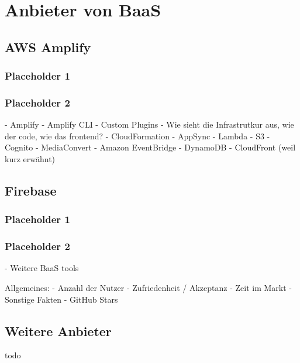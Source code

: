 \section{Anbieter von \acl{BaaS}}

\subsection{AWS Amplify}

\subsubsection{Placeholder 1}
\subsubsection{Placeholder 2}

\autocite{dahunsi2021commercial}
\autocite{amplifyDocs}
\autocite{lysakov2021security}
\autocite{mathew2014overview}
\autocite{beach2014aws}

  - Amplify
  - Amplify CLI
  - Custom Plugins
  - Wie sieht die Infrastrutkur aus, wie der code, wie das frontend?
  - CloudFormation
  - AppSync
  - Lambda
  - S3
  - Cognito
  - MediaConvert
  - Amazon EventBridge
  - DynamoDB
  - CloudFront (weil kurz erwähnt)

\subsection{Firebase}

\subsubsection{Placeholder 1}
\subsubsection{Placeholder 2}

\autocite{moroney2017definitive}
\autocite{firebaseDocs}
\autocite{tanna2018serverless}

- Weitere BaaS tools

Allgemeines:
  - Anzahl der Nutzer
  - Zufriedenheit / Akzeptanz
  - Zeit im Markt
  - Sonstige Fakten
  - GitHub Stars

\subsection{Weitere Anbieter}

todo
